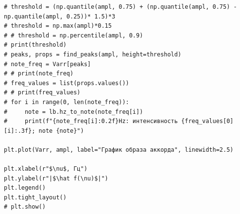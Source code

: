 \documentclass[a4paper, 12pt]{article}
\begin{document}
\begin{verbatim}
# threshold = (np.quantile(ampl, 0.75) + (np.quantile(ampl, 0.75) - np.quantile(ampl, 0.25))* 1.5)*3
# threshold = np.max(ampl)*0.15
# # threshold = np.percentile(ampl, 0.9)
# print(threshold)
# peaks, props = find_peaks(ampl, height=threshold)
# note_freq = Varr[peaks]
# # print(note_freq)
# freq_values = list(props.values())
# # print(freq_values)
# for i in range(0, len(note_freq)):
#     note = lb.hz_to_note(note_freq[i])
#     print(f"{note_freq[i]:0.2f}Hz: интенсивность {freq_values[0][i]:.3f}; note {note}")

plt.plot(Varr, ampl, label="График образа аккорда", linewidth=2.5)

plt.xlabel(r"$\nu$, Гц")
plt.ylabel(r"|$\hat f(\nu)$|")
plt.legend()
plt.tight_layout()
# plt.show()
\end{verbatim}
\label{code: task3}
\end{document}
